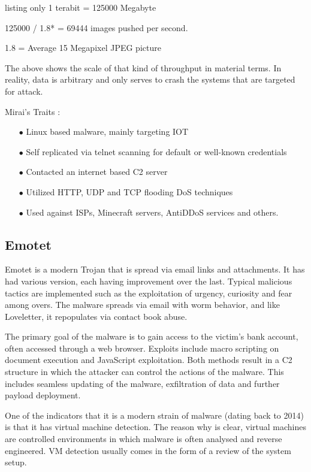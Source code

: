 \begin{tcblisting}{listing only}
1 terabit = 125000 Megabyte

125000 / 1.8* = 69444 images pushed per second. 
\end{tcblisting}

{\small* 1.8 = Average 15 Megapixel JPEG picture} \citep{imgAvg}

The above shows the scale of that kind of throughput in material terms. In reality, data is arbitrary and only serves to crash the systems that are targeted for attack.

Mirai's Traits \citep{Mirai}:
\begin{enumerate}
    \item [$\bullet$] Linux based malware, mainly targeting IOT
    \item [$\bullet$] Self replicated via telnet scanning for default or well-known credentials
    \item [$\bullet$] Contacted an internet based C2 server
    \item [$\bullet$] Utilized HTTP, UDP and TCP flooding DoS techniques
    \item [$\bullet$] Used against ISPs, Minecraft servers, AntiDDoS services and others.
\end{enumerate}

\subsection{Emotet}
Emotet is a modern Trojan that is spread via email links and attachments. It has had various version, each having improvement over the last. Typical malicious tactics are implemented such as the exploitation of urgency, curiosity and fear among overs. The malware spreads via email with worm behavior, and like Loveletter, it repopulates via contact book abuse. \citep{Emotet}

The primary goal of the malware is to gain access to the victim's bank account, often accessed through a web browser. Exploits include macro scripting on document execution and JavaScript exploitation. Both methods result in a C2 structure in which the attacker can control the actions of the malware. This includes seamless updating of the malware, exfiltration of data and further payload deployment. \citep{Emotet}

One of the indicators that it is a modern strain of malware (dating back to 2014) is that it has virtual machine detection. \citep{Emotet} The reason why is clear, virtual machines are controlled environments in which malware is often analysed and reverse engineered. VM detection usually comes in the form of a review of the system setup. 


